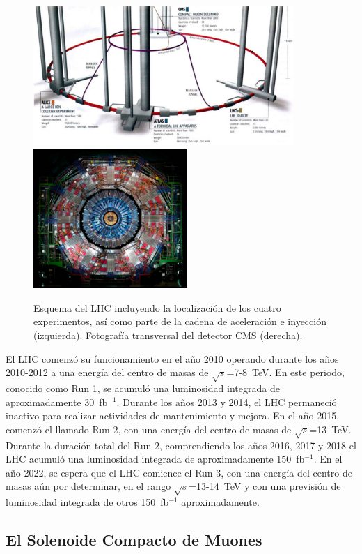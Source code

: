 \begin{figure}[ht]
\centering
\includegraphics[height=5.3cm]{fig/accelerator-view.pdf}
\includegraphics[height=5.3cm]{fig/cms-detector-cern.jpg}
\caption{Esquema del LHC incluyendo la localización de los cuatro experimentos, así como parte de la cadena de aceleración e inyección (izquierda). Fotografía transversal del detector CMS (derecha).}
\label{fig:lhc}
\end{figure} 

El LHC comenzó su funcionamiento en el año 2010 operando durante los años 2010-2012 a una energía del centro de masas de $\sqrt{s}$=7-8~TeV. En este periodo, conocido como Run 1, se acumuló una luminosidad integrada de aproximadamente 30~fb$^{-1}$. Durante los años 2013 y 2014, el LHC permaneció inactivo para realizar actividades de mantenimiento y mejora. En el año 2015, comenzó el llamado Run 2, con una energía del centro de masas de $\sqrt{s}$=13~TeV. Durante la duración total del Run 2, comprendiendo los años 2016, 2017 y 2018 el LHC acumuló una luminosidad integrada de aproximadamente 150~fb$^{-1}$. En el año 2022, se espera que el LHC comience el Run 3, con una energía del centro de masas aún por determinar, en el rango $\sqrt{s}$=13-14~TeV y con una previsión de luminosidad integrada de otros 150~fb$^{-1}$ aproximadamente. 


\subsection{El Solenoide Compacto de Muones}

